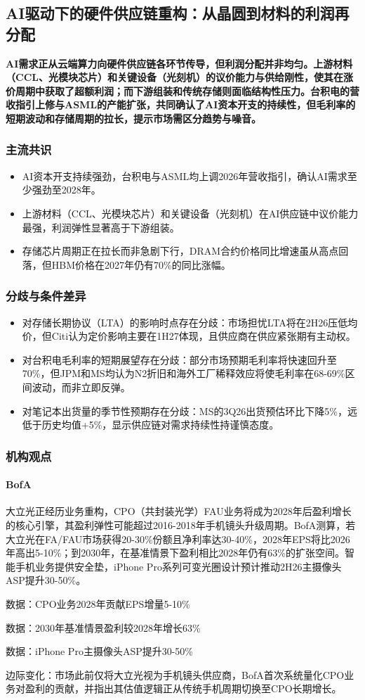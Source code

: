 \documentclass[11pt]{ctexart}
\begin{document}
\subsection{AI驱动下的硬件供应链重构：从晶圆到材料的利润再分配}
\textbf{AI需求正从云端算力向硬件供应链各环节传导，但利润分配并非均匀。上游材料（CCL、光模块芯片）和关键设备（光刻机）的议价能力与供给刚性，使其在涨价周期中获取了超额利润；而下游组装和传统存储则面临结构性压力。台积电的营收指引上修与ASML的产能扩张，共同确认了AI资本开支的持续性，但毛利率的短期波动和存储周期的拉长，提示市场需区分趋势与噪音。}
\subsubsection*{主流共识}
\begin{itemize}
  \item AI资本开支持续强劲，台积电与ASML均上调2026年营收指引，确认AI需求至少强劲至2028年。
  \item 上游材料（CCL、光模块芯片）和关键设备（光刻机）在AI供应链中议价能力最强，利润弹性显著高于下游组装。
  \item 存储芯片周期正在拉长而非急剧下行，DRAM合约价格同比增速虽从高点回落，但HBM价格在2027年仍有70\%的同比涨幅。
\end{itemize}
\subsubsection*{分歧与条件差异}
\begin{itemize}
  \item 对存储长期协议（LTA）的影响时点存在分歧：市场担忧LTA将在2H26压低均价，但Citi认为定价影响主要在1H27体现，且供应商在供应紧张期有主动权。
  \item 对台积电毛利率的短期展望存在分歧：部分市场预期毛利率将快速回升至70\%，但JPM和MS均认为N2折旧和海外工厂稀释效应将使毛利率在68-69\%区间波动，而非立即反弹。
  \item 对笔记本出货量的季节性预期存在分歧：MS的3Q26出货预估环比下降5\%，远低于历史均值+5\%，显示供应链对需求持续性持谨慎态度。
\end{itemize}
\subsubsection*{机构观点}
\paragraph{BofA} 大立光正经历业务重构，CPO（共封装光学）FAU业务将成为2028年后盈利增长的核心引擎，其盈利弹性可能超过2016-2018年手机镜头升级周期。BofA测算，若大立光在FA/FAU市场获得20-30\%份额且净利率达30-40\%，2028年EPS将比2026年高出5-10\%；到2030年，在基准情景下盈利相比2028年仍有63\%的扩张空间。智能手机业务提供安全垫，iPhone Pro系列可变光圈设计预计推动2H26主摄像头ASP提升30-50\%。
{\small\color{refgray}数据：CPO业务2028年贡献EPS增量5-10\%\par}
{\small\color{refgray}数据：2030年基准情景盈利较2028年增长63\%\par}
{\small\color{refgray}数据：iPhone Pro主摄像头ASP提升30-50\%\par}
{\small\color{refgray}边际变化：市场此前仅将大立光视为手机镜头供应商，BofA首次系统量化CPO业务对盈利的贡献，并指出其估值逻辑正从传统手机周期切换至CPO长期增长。\par}
\end{document}
